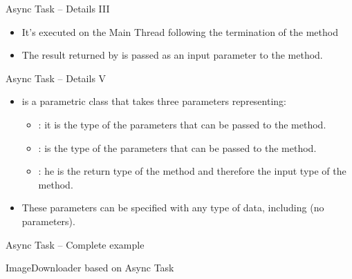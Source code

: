 \documentclass{beamer}
\begin{document}
  \begin{frame}{Async Task -- Details III}
    \begin{block}{}
      \begin{itemize}
        \item It's executed on the Main Thread following the termination of the
         method
        \item The result returned by  is passed as an
        input parameter to the method. 
      \end{itemize}
    \end{block}
  \end{frame}
 
  \begin{frame}{Async Task -- Details V}
    \begin{block}{}
      \begin{itemize}
        \item {} is a parametric class
        that takes three parameters representing:
        \begin{itemize}
          \item {}: it is the type of the parameters that can be
          passed to the  method.
          \item {}: is the type of the parameters that can be passed
          to the  method. 
          \item {}: he is the return type of the 
          method and therefore the input type of the  method.
        \end{itemize}
        \item These parameters can be specified with any type of data, including
         (no parameters).
      \end{itemize}
    \end{block}
  \end{frame}

  \begin{frame}{Async Task -- Complete example}
    \begin{exampleblock}{ImageDownloader based on Async Task}
      
    \end{exampleblock}
    \begin{exampleblock}{}
      
    \end{exampleblock}
  \end{frame}
\end{document}
